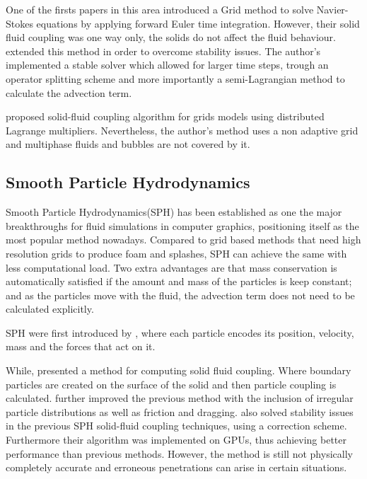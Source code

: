 One of the firsts papers in this area introduced a Grid method \cite{Foster1996} to solve Navier-Stokes equations by applying forward Euler time integration.
However, their solid fluid coupling was one way only, the solids do not affect the fluid behaviour.
\cite{Stam1999} extended this method in order to overcome stability issues.
The author's implemented a stable solver which allowed for larger time steps, trough an operator splitting scheme and more importantly a semi-Lagrangian method to calculate the advection term.

\cite{Carlson2004} proposed solid-fluid coupling algorithm for grids models using distributed Lagrange multipliers.
Nevertheless, the author's method uses  a non adaptive grid and multiphase fluids and bubbles are not covered by it.

\subsection{Smooth Particle Hydrodynamics}

Smooth Particle Hydrodynamics(SPH) has been established as one the major breakthroughs for fluid simulations in computer graphics, positioning itself as the most popular method nowadays.
Compared to grid based methods that need high resolution grids to produce foam and splashes, SPH can achieve the same with less computational load.
Two extra advantages are that mass conservation is automatically satisfied if the amount and mass of the particles is keep constant;
and as the particles move with the fluid, the advection term does not need to be calculated explicitly.

SPH were first introduced by \cite{DesbrunMathieuandGascuel1996}, where each particle encodes its position, velocity, mass and the forces that act on it.

While, \cite{Muller2004} presented a method for computing solid fluid coupling. Where boundary particles are created on the surface of the solid and then particle coupling is calculated.
\cite{Akinci2012} further improved the previous method with the inclusion of irregular particle distributions as well as friction and dragging. 
\cite{Shao2014} also solved stability issues in the previous SPH solid-fluid coupling techniques, using a correction scheme.
Furthermore their algorithm was implemented on GPUs, thus achieving better performance than previous methods.  
However, the method is still not physically completely accurate and erroneous penetrations can arise in certain situations. 

